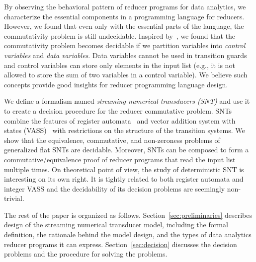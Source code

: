 \documentclass[runningheads,a4paper]{llncs}
\begin{document}
By observing the behavioral pattern of reducer programs for data analytics, we characterize the essential components in a programming language for reducers. However, we found that even only with the essential parts of the language, the commutativity problem is still undecidable. 
Inspired by~\cite{RP11}, we found that the commutativity problem becomes decidable if we partition variables into \emph{control variables} and \emph{data variables}. Data variables cannot be used in transition guards and control variables can store only elements in the input list (e.g., it is not allowed to store the sum of two variables in a control variable). 
We believe such concepts provide good insights for reducer programming language design.

We define a formalism named \emph{streaming numerical transducers (SNT)} and use it to create a decision procedure for the reducer commutative problem.
SNTs combine the features of register automata~\cite{XX} and vector addition system with states (VASS)~\cite{YY} with restrictions on the structure of the transition systems.
We show that the equivalence, commutative, and non-zeroness problems of generalized flat SNTs are decidable.
Moreover, SNTs can be composed to form a commutative/equivalence proof of reducer programs that read the input list multiple times.
On theoretical point of view, the study of deterministic SNT is
interesting on its own right. It is tightly related to both register automata and integer VASS and the decidability of its decision problems are seemingly non-trivial. 

The rest of the paper is organized as follows. Section~\ref{sec:preliminaries} describes design of the streaming numerical transducer model, including the formal definition, the rationale behind the model design, and the types of data analytics reducer programs it can express. Section~\ref{sec:decision} discusses the decision problems and the procedure for solving the problems.
\end{document}
